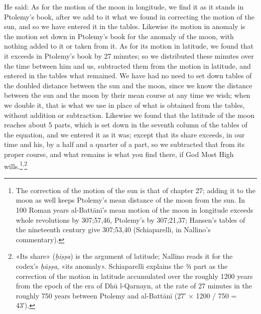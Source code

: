\documentclass[11pt]{article}
\newcommand{\ArPage}[1]{\marginpar{\footnotesize\color{gray}Ar.\,p.\,#1}}
\begin{document}
\par \ArPage{83}He said: As for the motion of the moon in longitude, we find it as it stands in Ptolemy's book, after we add to it what we found in correcting the motion of the sun, and so we have entered it in the tables. Likewise its motion in anomaly is the motion set down in Ptolemy's book for the anomaly of the moon, with nothing added to it or taken from it. As for its motion in latitude, we found that it exceeds in Ptolemy's book by 27 minutes; so we distributed these minutes over the time between him and us, subtracted them from the motion in latitude, and entered in the tables what remained. We have had no need to set down tables of the doubled distance between the sun and the moon, since we know the distance between the sun and the moon by their mean course at any time we wish; when we double it, that is what we use in place of what is obtained from the tables, without addition or subtraction. Likewise we found that the latitude of the moon reaches about 5 parts, which is set down in the seventh column of the tables of the equation, and we entered it as it was; except that its share exceeds, in our time and his, by a half and a quarter of a part, so we subtracted that from its proper course, and what remains is what you find there, if God Most High wills.\footnote{The correction of the motion of the sun is that of chapter 27; adding it to the moon as well keeps Ptolemy's mean distance of the moon from the sun. In 100 Roman years al-Battānī's mean motion of the moon in longitude exceeds whole revolutions by 307;57,46, Ptolemy's by 307;21,37; Hansen's tables of the nineteenth century give 307;53,40 (Schiaparelli, in Nallino's commentary).}\textsuperscript{,}\footnote{«Its share» (\emph{ḥiṣṣa}) is the argument of latitude; Nallino reads it for the codex's \emph{ḥāṣṣa}, «its anomaly». Schiaparelli explains the ¾ part as the correction of the motion in latitude accumulated over the roughly 1200 years from the epoch of the era of Dhū l-Qarnayn, at the rate of 27 minutes in the roughly 750 years between Ptolemy and al-Battānī (27′ × 1200 / 750 = 43′).}\par
\end{document}
